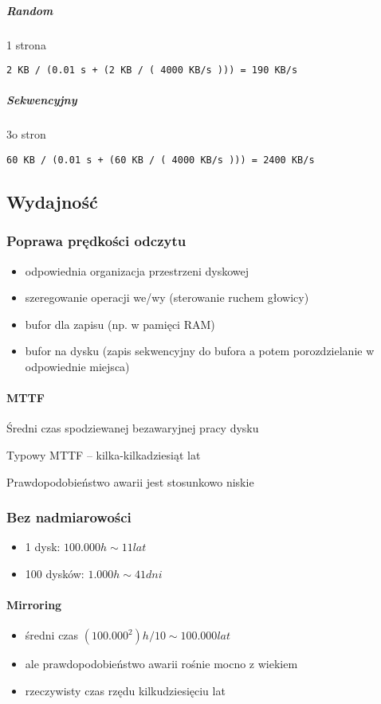 \documentclass[12pt]{article}
\begin{document}
\subparagraph{Random}
1 strona
\begin{verbatim}
2 KB / (0.01 s + (2 KB / ( 4000 KB/s ))) = 190 KB/s
\end{verbatim}
\subparagraph{Sekwencyjny}
3o stron
\begin{verbatim}
60 KB / (0.01 s + (60 KB / ( 4000 KB/s ))) = 2400 KB/s
\end{verbatim}

\subsection{Wydajność}

\subsubsection{Poprawa prędkości odczytu}
\begin{itemize}
\item odpowiednia organizacja przestrzeni dyskowej
\item szeregowanie operacji we/wy (sterowanie ruchem głowicy)
\item bufor dla zapisu (np. w pamięci RAM)
\item bufor na dysku (zapis sekwencyjny do bufora a potem porozdzielanie w odpowiednie miejsca)
\end{itemize}

\paragraph{\ac{MTTF}}
Średni czas spodziewanej bezawaryjnej pracy dysku

Typowy MTTF -- kilka-kilkadziesiąt lat

Prawdopodobieństwo awarii jest stosunkowo niskie

\subsubsection{Bez nadmiarowości}
\begin{itemize}
\item 1 dysk: $ 100.000h \sim 11 lat $
\item 100 dysków: $ 1.000h \sim 41dni $
\end{itemize}
\paragraph{Mirroring}
\begin{itemize}
\item średni czas $ (100.000 ^ 2)h / 10 \sim 100.000 lat $
\item ale prawdopodobieństwo awarii rośnie mocno z wiekiem
\item rzeczywisty czas rzędu kilkudziesięciu lat
\end{itemize}
\end{document}
